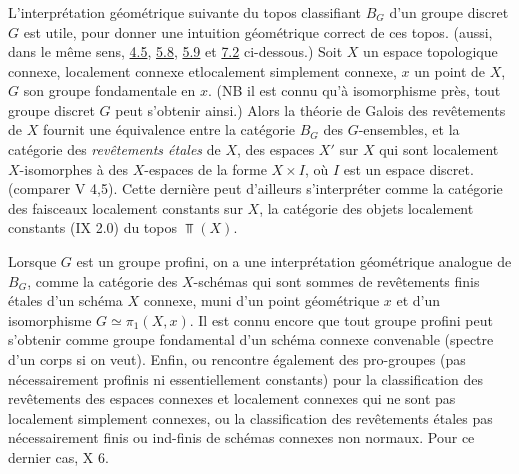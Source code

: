 \documentclass[10pt]{../fichiers-configuration-latex/smfart}
\begin{document}
\subsubsection{}
L'interprétation géométrique suivante du topos classifiant
$B_G$ d'un groupe discret $G$ est utile, pour donner une intuition
géométrique correct de ces topos. (\Cf aussi, dans le même
sens, \hyperref[IV.subsec4.5]{4.5}, \hyperref[IV.subsec5.8]{5.8}, \hyperref[IV.exer5.9]{5.9} et
\hyperref[IV.subsec7.2]{7.2} ci-dessous.) Soit $X$ un espace topologique
connexe, localement connexe et\pageoriginale localement simplement
connexe, $x$ un point de $X$, $G$ son groupe fondamentale en $x$.
(NB il est connu qu'à isomorphisme près, tout groupe discret $G$
peut s'obtenir ainsi.) Alors la théorie de Galois des
revêtements de $X$ fournit une équivalence entre la catégorie
$B_G$ des $G$-ensembles, et la catégorie des \emph{revêtements
étales} de $X$, \ie des espaces $X'$ sur $X$ qui sont localement
$X$-isomorphes à des $X$-espaces de la forme $X\times I$, où $I$
est un espace discret. (comparer  V 4,5). Cette dernière
peut d'ailleurs s'interpréter comme la catégorie des faisceaux
localement constants sur $X$, \ie la catégorie des objets
localement constants (IX 2.0) du topos $\Top(X)$.

Lorsque $G$ est un groupe profini, on a une interprétation
géométrique analogue de $B_G$, comme la catégorie des
$X$-schémas qui sont sommes de revêtements finis étales d'un
schéma $X$ connexe, muni d'un point géométrique $x$ et d'un
isomorphisme $G\simeq \pi_1(X,x)$. Il est connu encore que tout
groupe profini peut s'obtenir comme groupe fondamental d'un schéma
connexe convenable (spectre d'un corps si on veut). Enfin, ou
rencontre également des pro-groupes (pas nécessairement profinis
ni essentiellement constants) pour la classification des
revêtements des espaces connexes et localement connexes qui ne
sont pas localement simplement connexes, ou la classification des
revêtements étales pas nécessairement finis ou ind-finis de
schémas connexes non normaux. Pour ce dernier cas, \cf {} X 6.
\end{document}
